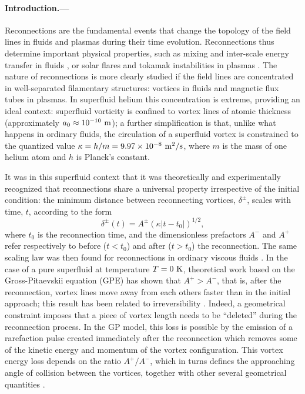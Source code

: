 \documentclass[%
 reprint,
 amsmath,amssymb,
 aps,
 prl,
]{revtex4-2}
\begin{document}
\paragraph*{Introduction.---} Reconnections are the fundamental events that
change the topology of the field lines in fluids and plasmas during their
time evolution. Reconnections
thus determine important physical properties, 
such as mixing and inter-scale energy transfer in fluids \cite{YaoHussainAnnRev2022}, 
or solar flares and tokamak instabilities
in plasmas \cite{Chapman2010}. The nature of reconnections is more clearly
studied if the field lines are concentrated in well-separated
filamentary structures:
vortices in fluids and magnetic flux tubes in plasmas. In superfluid 
helium this concentration is extreme, providing an ideal context:
superfluid vorticity is confined to vortex lines of atomic thickness 
(approximately $a_0 \approx 10^{-10}~\rm m$); a further simplification 
is that, unlike what happens in ordinary fluids, the
circulation of a superfluid vortex  is constrained to the quantized value
$\kappa=h/m=9.97 \times 10^{-8}~\rm m^2/s$, 
where $m$ is the mass of one helium atom and $h$ is Planck's constant. 

It was in this superfluid context that it was theoretically and experimentally recognized
\cite{nazarenko2003,bewley2008,paoletti2010,zuccherQuantumVortexReconnections2012a,villoisUniversalNonuniversalAspects2017a,galantucciCrossoverInteractionDriven2019a}
that reconnections share a universal property irrespective of the initial
condition: the minimum distance between reconnecting 
vortices, $\delta^{\pm}$, scales with time, $t$, according to the form
\begin{equation}
\label{eq:scaling}
	\delta^{\pm}(t) = A^{\pm} (\kappa|t-t_0|)^{1/2},
\end{equation} 
\noindent
where $t_0$ is the reconnection time, and the dimensionless
prefactors $A^-$ and $A^+$ refer respectively to before
($t<t_0$) and after ($t>t_0$) the reconnection. The same scaling law
was then found for reconnections in ordinary viscous fluids 
\cite{yaoSeparationScalingViscous2020}. In the case of a pure
superfluid at temperature $T=0~\rm K$, theoretical work based on
the Gross-Pitaevskii equation (GPE) has shown that
$A^+>A^-$, that is, after the reconnection, vortex lines move away from 
each others faster than in the initial approach; this result has been
related to irreversibility \cite{villoisIrreversibleDynamicsVortex2020,promentMatchingTheoryCharacterize2020}. Indeed, a geometrical constraint imposes that a piece of vortex length needs to be ``deleted'' during the reconnection process. In the GP model, this loss is possible by the emission of a rarefaction pulse created immediately after the reconnection
\cite{leadbeaterSoundEmissionDue2001b,zuccherQuantumVortexReconnections2012a} which removes some of the kinetic energy and momentum of the vortex configuration.
This vortex energy loss depends on
the ratio $A^+/A^-$, which in turns defines the approaching angle of collision
between the vortices, together with other several geometrical quantities \cite{villoisUniversalNonuniversalAspects2017a,promentMatchingTheoryCharacterize2020}. 
\end{document}
